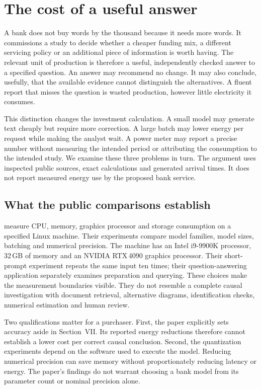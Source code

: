 \section{The cost of a useful answer}
\label{closure:energy-study}

A bank does not buy words by the thousand because it needs more words. It
commissions a study to decide whether a cheaper funding mix, a different
servicing policy or an additional piece of information is worth having.
The relevant unit of production is therefore a useful, independently checked
answer to a specified question. An answer may recommend no change. It may
also conclude, usefully, that the available evidence cannot distinguish the
alternatives. A fluent report that misses the question is wasted production,
however little electricity it consumes.

This distinction changes the investment calculation. A small model may
generate text cheaply but require more correction. A large batch may lower
energy per request while making the analyst wait. A power meter may report a
precise number without measuring the intended period or attributing the
consumption to the intended study. We examine these three problems in turn.
The argument uses inspected public sources, exact calculations and generated
arrival times. It does not report measured energy use by the proposed bank
service.

\subsection{What the public comparisons establish}

\citet{closureArgerich2024} measure CPU, memory, graphics processor and
storage consumption on a specified Linux machine. Their experiments compare
model families, model sizes, batching and numerical precision. The machine
has an Intel i9-9900K processor, 32\,GB of memory and an NVIDIA RTX\,4090
graphics processor. Their short-prompt experiment repeats the same input ten
times; their question-answering application separately examines preparation
and querying. These choices make the measurement boundaries visible. They
do not resemble a complete causal investigation with document retrieval,
alternative diagrams, identification checks, numerical estimation and
human review.

Two qualifications matter for a purchaser. First, the paper explicitly sets
accuracy aside in Section~VII. Its reported energy reductions therefore
cannot establish a lower cost per correct causal conclusion. Second, the
quantization experiments depend on the software used to execute the model.
Reducing numerical precision can save memory without proportionately reducing
latency or energy. The paper's findings do not warrant choosing a bank model
from its parameter count or nominal precision alone.

